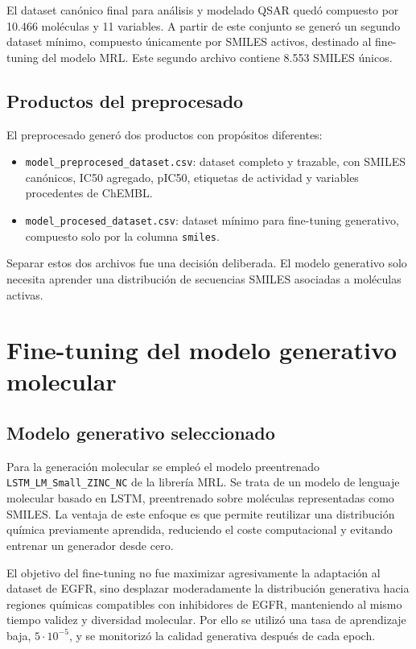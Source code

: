 \documentclass[IB]{TFUOC}%
\begin{document}
El dataset canónico final para análisis y modelado QSAR quedó compuesto por 10.466 moléculas y 11 variables. A partir de este conjunto se generó un segundo dataset mínimo, compuesto únicamente por SMILES activos, destinado al fine-tuning del modelo MRL. Este segundo archivo contiene 8.553 SMILES únicos.

\subsection{Productos del preprocesado}

El preprocesado generó dos productos con propósitos diferentes:

\begin{itemize}
    \item \texttt{model\_preprocesed\_dataset.csv}: dataset completo y trazable, con SMILES canónicos, IC50 agregado, pIC50, etiquetas de actividad y variables procedentes de ChEMBL.
    \item \texttt{model\_procesed\_dataset.csv}: dataset mínimo para fine-tuning generativo, compuesto solo por la columna \texttt{smiles}.
\end{itemize}

Separar estos dos archivos fue una decisión deliberada. El modelo generativo solo necesita aprender una distribución de secuencias SMILES asociadas a moléculas activas.

\section{Fine-tuning del modelo generativo molecular}

\subsection{Modelo generativo seleccionado}

Para la generación molecular se empleó el modelo preentrenado \texttt{LSTM\_LM\_Small\_ZINC\_NC} de la librería MRL. Se trata de un modelo de lenguaje molecular basado en LSTM, preentrenado sobre moléculas representadas como SMILES. La ventaja de este enfoque es que permite reutilizar una distribución química previamente aprendida, reduciendo el coste computacional y evitando entrenar un generador desde cero.

El objetivo del fine-tuning no fue maximizar agresivamente la adaptación al dataset de EGFR, sino desplazar moderadamente la distribución generativa hacia regiones químicas compatibles con inhibidores de EGFR, manteniendo al mismo tiempo validez y diversidad molecular. Por ello se utilizó una tasa de aprendizaje baja, $5 \cdot 10^{-5}$, y se monitorizó la calidad generativa después de cada epoch.
\end{document}
